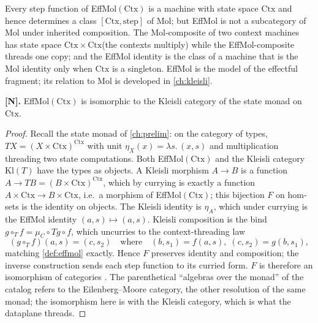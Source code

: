 \begin{remark}
Every step function of EffMol$(\mathrm{Ctx})$ is a machine with state space
$\mathrm{Ctx}$ and hence determines a class $[\mathrm{Ctx}, \mathrm{step}]$
of Mol; but EffMol is not a subcategory of Mol under inherited composition.
The Mol-composite of two context machines has state space
$\mathrm{Ctx} \times \mathrm{Ctx}$(the contexts multiply) while the
EffMol-composite threads one copy; and the EffMol identity is the class of a
machine that is the Mol identity only when $\mathrm{Ctx}$ is a singleton.
EffMol is the model of the effectful fragment; its relation to Mol is
developed in \autoref{ch:kleisli}.
\end{remark}

\begin{theorem}\label{thm:5}
\textbf{[N].} EffMol$(\mathrm{Ctx})$ is isomorphic to the Kleisli category of
the state monad on $\mathrm{Ctx}$.
\end{theorem}

\begin{proof}
Recall the state monad of \autoref{ch:prelim}: on the category of types,
$T X = (X \times \mathrm{Ctx})^{\mathrm{Ctx}}$ with unit
$\eta_X (x) = \lambda s.\,(x, s)$ and multiplication threading two state
computations. Both EffMol$(\mathrm{Ctx})$ and the Kleisli category
$\mathrm{Kl} (T)$ have the types as objects. A Kleisli morphism $A \to B$ is a
function $A \to T B = (B \times \mathrm{Ctx})^{\mathrm{Ctx}}$, which by
currying is exactly a function $A \times \mathrm{Ctx} \to B \times
\mathrm{Ctx}$, i.e.\ a morphism of EffMol$(\mathrm{Ctx})$; this bijection
$F$ on hom-sets is the identity on objects. The Kleisli identity is
$\eta_A$, which under currying is the EffMol identity $(a, s) \mapsto (a, s)$.
Kleisli composition is the bind $g \circ_T f = \mu_C \circ T g \circ f$, which
uncurries to the context-threading law
\[ (g \circ_T f)(a, s) = (c, s_2) \quad\text{where}\quad (b, s_1) = f (a, s),\; (c, s_2) = g (b, s_1) , \]
matching \autoref{def:effmol} exactly. Hence $F$ preserves identity and
composition; the inverse construction sends each step function to its
curried form. $F$ is therefore an isomorphism of categories
\citep{maclane, arxiv-monads-kleisli}. The parenthetical ``algebras over the
monad'' of the catalog refers to the Eilenberg--Moore category, the other
resolution of the same monad; the isomorphism here is with the Kleisli
category, which is what the dataplane threads.
\end{proof}

